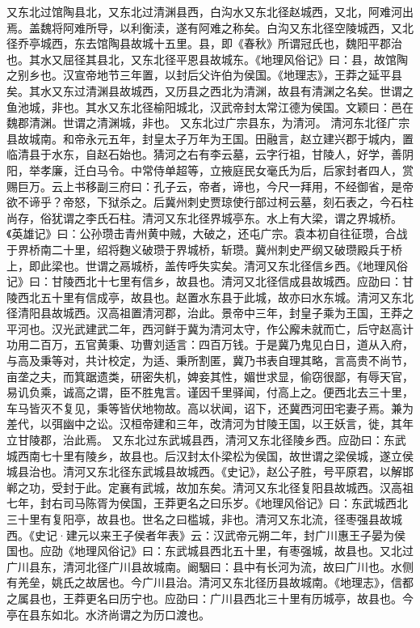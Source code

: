\documentclass[12pt,UTF8]{ctexbook}
\begin{document}
又东北过馆陶县北，又东北过清渊县西，白沟水又东北径赵城西，又北，阿难河出焉。盖魏将阿难所导，以利衡渎，遂有阿难之称矣。白沟又东北径空陵城西，又北径乔亭城西，东去馆陶县故城十五里。县，即《春秋》所谓冠氏也，魏阳平郡治也。其水又屈径其县北，又东北径平恩县故城东。《地理风俗记》曰：县，故馆陶之别乡也。汉宣帝地节三年置，以封后父许伯为侯国。《地理志》，王莽之延平县矣。其水又东过清渊县故城西，又历县之西北为清渊，故县有清渊之名矣。世谓之鱼池城，非也。其水又东北径榆阳城北，汉武帝封太常江德为侯国。文颖曰：邑在魏郡清渊。世谓之清渊城，非也。
又东北过广宗县东，为清河。
清河东北径广宗县故城南。和帝永元五年，封皇太子万年为王国。田融言，赵立建兴郡于城内，置临清县于水东，自赵石始也。猜河之右有李云墓，云字行祖，甘陵人，好学，善阴阳，举孝廉，迁白马令。中常侍单超等，立掖庭民女毫氏为后，后家封者四人，赏赐巨万。云上书移副三府曰：孔子云，帝者，谛也，今尺一拜用，不经御省，是帝欲不谛乎？帝怒，下狱杀之。后冀州刺史贾琼使行部过柯云墓，刻石表之，今石柱尚存，俗犹谓之李氏石柱。清河又东北径界城亭东。水上有大梁，谓之界城桥。《英雄记》曰：公孙瓒击青州黄中贼，大破之，还屯广宗。袁本初自往征瓒，合战于界桥南二十里，绍将麴义破瓒于界城桥，斩瓒。冀州刺史严纲又破瓒殿兵于桥上，即此梁也。世谓之鬲城桥，盖传呼失实矣。清河又东北径信乡西。《地理风俗记》曰：甘陵西北十七里有信乡，故县也。清河又北径信成县故城西。应劭曰：甘陵西北五十里有信成亭，故县也。赵置水东县于此城，故亦曰水东城。清河又东北径清阳县故城西。汉高祖置清河郡，治此。景帝中三年，封皇子乘为王国，王莽之平河也。汉光武建武二年，西河鲜于冀为清河太守，作公廨未就而亡，后守赵高计功用二百万，五官黄秉、功曹刘适言：四百万钱。于是冀乃鬼见白日，道从入府，与高及秉等对，共计校定，为适、秉所割匿，冀乃书表自理其略，言高贵不尚节，亩垄之夫，而箕踞遗类，研密失机，婢妾其性，媚世求显，偷窃很鄙，有辱天官，易讥负乘，诚高之谓，臣不胜鬼言。谨因千里驿闻，付高上之。便西北去三十里，车马皆灭不复见，秉等皆伏地物故。高以状闻，诏下，还冀西河田宅妻子焉。兼为差代，以弭幽中之讼。汉桓帝建和三年，改清河为甘陵王国，以王妖言，徙，其年立甘陵郡，治此焉。
又东北过东武城县西，清河又东北径陵乡西。应劭曰：东武城西南七十里有陵乡，故县也。后汉封太仆梁松为侯国，故世谓之梁侯城，遂立侯城县治也。清河又东北径东武城县故城西。《史记》，赵公子胜，号平原君，以解邯郸之功，受封于此。定襄有武城，故加东矣。清河又东北径复阳县故城西。汉高祖七年，封右司马陈胥为侯国，王莽更名之曰乐岁。《地理风俗记》曰：东武城西北三十里有复阳亭，故县也。世名之曰槛城，非也。清河又东北流，径枣强县故城西。《史记·建元以来王子侯者年表》云：汉武帝元朔二年，封广川惠王子晏为侯国也。应劭《地理风俗记》曰：东武城县西北五十里，有枣强城，故县也。又北过广川县东，清河北径广川县故城南。阚駰曰：县中有长河为流，故曰广川也。水侧有羌垒，姚氏之故居也。今广川县治。清河又东北径历县故城南。《地理志》，信都之属县也，王莽更名曰历宁也。应劭曰：广川县西北三十里有历城亭，故县也。今亭在县东如北。水济尚谓之为历口渡也。
\end{document}
